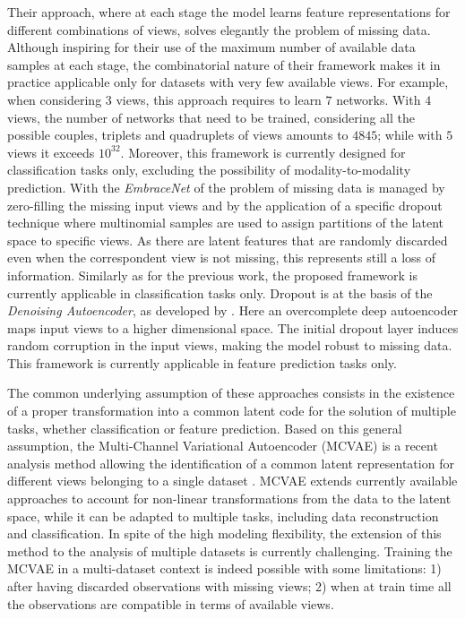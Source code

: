 	Their approach, where at each stage the model learns feature representations for different combinations of views, solves elegantly the problem of missing data.
	Although inspiring for their use of the maximum number of available data samples at each stage,
	the combinatorial nature of their framework makes it in practice applicable only for datasets with very few available views.
	For example, when considering $3$ views, this approach requires to learn $7$ networks.
	With $4$ views, the number of networks that need to be trained, considering all the possible couples, triplets and quadruplets of views amounts to $4845$;
	while with $5$ views it exceeds $10^{32}$.
	Moreover, this framework is currently designed for classification tasks only, excluding the possibility of modality-to-modality prediction.
	With the \textit{EmbraceNet} of \cite{embracenet} the problem of missing data is managed by zero-filling the missing input views and by the application of a specific dropout technique where multinomial samples are used to assign partitions of the latent space to specific views.
	As there are latent features that are randomly discarded even when the correspondent view is not missing, this represents still a loss of information.
	Similarly as for the previous work, the proposed framework is currently applicable in classification tasks only.
Dropout is at the basis of the \textit{Denoising Autoencoder}, as developed by \cite{dae}.
Here an overcomplete deep autoencoder maps input views to a higher dimensional space.
The initial dropout layer induces random corruption in the input views, making the model robust to missing data.
This framework is currently applicable in feature prediction tasks only.

The common underlying assumption of these approaches consists in the existence of a
proper transformation into a common latent code for the solution of multiple tasks,
whether classification or feature prediction.
%
Based on this general assumption,
the Multi-Channel Variational Autoencoder (MCVAE) \citep{Antelmi2019}
is a recent  analysis method allowing the identification of a common latent representation for different views belonging to a single dataset .
MCVAE extends currently available approaches to account for non-linear transformations from the data to the latent space,
while it can be adapted to multiple tasks, including data reconstruction and classification.
In spite of the high modeling flexibility, the extension of this method to the analysis of multiple datasets is currently challenging.
Training the MCVAE in a multi-dataset context is indeed possible with some limitations:
1) after having discarded observations with missing views;
2) when at train time all the observations are compatible in terms of available views.

